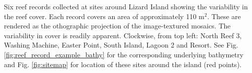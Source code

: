 \label{fig:six_samples} Six reef records collected at sites around Lizard Island showing the variability in the reef cover. Each record covers an area of approximately 110 m$^2$. These are rendered as the othographic projection of the image-textured mosaics. The variability in cover is readily apparent. Clockwise, from top left: North Reef 3, Washing Machine, Easter Point, South Island, Lagoon 2 and Resort. See Fig. \ref{fig:reef_record_example_bathy} for the corresponding underlying bathymetry and Fig. \ref{fig:sitemap} for location of these sites around the island (red points).